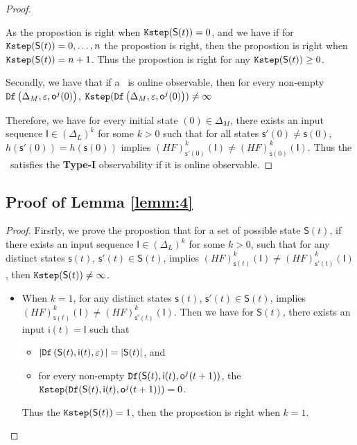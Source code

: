 \begin{appendices}
\begin{proof}
\begin{itemize}
\end{itemize}
As the propostion is right when ${\tt Kstep}(\mathsf{S}(t))=0$, and we have if for ${\tt Kstep}(\mathsf{S}(t))=0,\ldots, n$ the propostion is right, then the propostion is right when ${\tt Kstep}(\mathsf{S}(t))=n+1$. Thus the propostion is right for any ${\tt Kstep}(\mathsf{S}(t))\ge0$.

Secondly, we have that if a \BCN\ is online observable,
then for every  non-empty ${\tt Df}\left(\Delta_M,\varepsilon, \mathsf{o}^{j}(0)\right)$, ${\tt Kstep}({\tt Df}\left(\Delta_M,\varepsilon, \mathsf{o}^{j}(0)\right))\ne \infty$

Therefore, we have for every initial state \State$(0)$$\in \Delta_M$, there exists an input sequence $\mathsf{I}\in(\Delta_L)^{k}$ for some $k >0$ such that for all states $\mathsf{s}'(0)\neq \mathsf{s}(0)$, $h(\mathsf{s}'(0))=h(\mathsf{s}(0))$ implies $(HF)^{k}_{\mathsf{s}'(0)}(\mathsf{I})\neq (HF)^{k}_{{\mathsf{s}(0)}}(\mathsf{I})$. Thus the \BCN\ satisfies the  {\bf Type-I} observability if it is online observable.
\end{proof}

\subsection{Proof of Lemma \ref{lemm:4}}

\begin{proof}
Firsrly, we prove the propostion that for a set of possible state $\mathsf{S}(t)$, if there exists an input sequence $\mathsf{I}\in(\Delta_L)^{k}$ for some $k >0$, such that for any distinct states $\mathsf{s}(t)$, $\mathsf{s}'(t) \in \mathsf{S}(t)$, implies $(HF)^{k}_{\mathsf{s}(t)}(\mathsf{I})\neq (HF)^{k}_{\mathsf{s}'(t)}(\mathsf{I})$, then ${\tt Kstep}(\mathsf{S}(t))\ne\infty$.

\begin{itemize}
\item When $k=1$, for any distinct states $\mathsf{s}(t)$, $\mathsf{s}'(t) \in \mathsf{S}(t)$, implies $(HF)^{k}_{\mathsf{s}(t)}(\mathsf{I})\neq (HF)^{k}_{\mathsf{s}'(t)}(\mathsf{I})$. Then we have for $\mathsf{S}(t)$,
 there exists an input $\mathsf{i}(t)=\mathsf{I}$ such that
 \begin{itemize}
 \item  $|{\tt Df}\left(\mathsf{S}(t),\mathsf{i}(t),\varepsilon\right)|=|\mathsf{S}(t)|$, and 
 \item  for every non-empty ${\tt Df}(\mathsf{S}(t),\mathsf{i}(t),\mathsf{o}^{j}(t+1))$, the ${\tt Kstep}({\tt Df}(\mathsf{S}(t),\mathsf{i}(t),\mathsf{o}^{j}(t+1)))=0$.
 \end{itemize}
Thus the ${\tt Kstep}(\mathsf{S}(t))=1$, then the propostion is right when $k =1$.


\end{itemize}
\end{proof}
\end{appendices}
